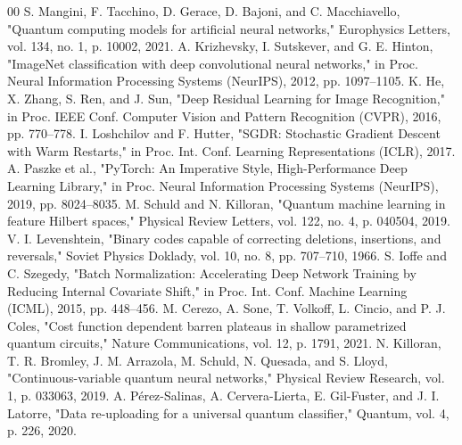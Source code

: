 \documentclass{ieeeaccess}
\begin{document}
\begin{thebibliography}{00}
 S. Mangini, F. Tacchino, D. Gerace, D. Bajoni, and C. Macchiavello, "Quantum computing models for artificial neural networks," Europhysics Letters, vol. 134, no. 1, p. 10002, 2021.
 A. Krizhevsky, I. Sutskever, and G. E. Hinton, "ImageNet classification with deep convolutional neural networks," in Proc. Neural Information Processing Systems (NeurIPS), 2012, pp. 1097--1105.
 K. He, X. Zhang, S. Ren, and J. Sun, "Deep Residual Learning for Image Recognition," in Proc. IEEE Conf. Computer Vision and Pattern Recognition (CVPR), 2016, pp. 770--778.
 I. Loshchilov and F. Hutter, "SGDR: Stochastic Gradient Descent with Warm Restarts," in Proc. Int. Conf. Learning Representations (ICLR), 2017.
 A. Paszke et al., "PyTorch: An Imperative Style, High-Performance Deep Learning Library," in Proc. Neural Information Processing Systems (NeurIPS), 2019, pp. 8024--8035.
 M. Schuld and N. Killoran, "Quantum machine learning in feature Hilbert spaces," Physical Review Letters, vol. 122, no. 4, p. 040504, 2019.
 V. I. Levenshtein, "Binary codes capable of correcting deletions, insertions, and reversals," Soviet Physics Doklady, vol. 10, no. 8, pp. 707--710, 1966.
 S. Ioffe and C. Szegedy, "Batch Normalization: Accelerating Deep Network Training by Reducing Internal Covariate Shift," in Proc. Int. Conf. Machine Learning (ICML), 2015, pp. 448--456.
 M. Cerezo, A. Sone, T. Volkoff, L. Cincio, and P. J. Coles, "Cost function dependent barren plateaus in shallow parametrized quantum circuits," Nature Communications, vol. 12, p. 1791, 2021.
 N. Killoran, T. R. Bromley, J. M. Arrazola, M. Schuld, N. Quesada, and S. Lloyd, "Continuous-variable quantum neural networks," Physical Review Research, vol. 1, p. 033063, 2019.
 A. Pérez-Salinas, A. Cervera-Lierta, E. Gil-Fuster, and J. I. Latorre, "Data re-uploading for a universal quantum classifier," Quantum, vol. 4, p. 226, 2020.

\end{thebibliography}
\end{document}
